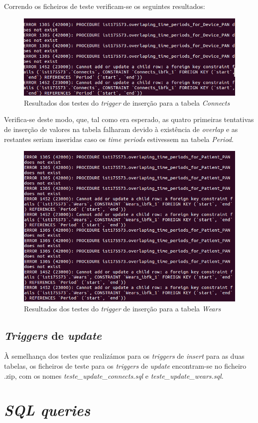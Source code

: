 \documentclass[a4paper]{article}
\begin{document}
Correndo os ficheiros de teste verificam-se os seguintes resultados:

\begin{figure}[ht!]
\centering
\includegraphics[scale=0.7]{insert_connects.png}
\caption{Resultados dos testes do \textit{trigger} de inserção para a tabela \textit{Connects}}
\end{figure}

Verifica-se deste modo, que, tal como era esperado, as quatro primeiras tentativas de inserção de valores na tabela falharam devido à existência de \textit{overlap} e as restantes seriam inseridas caso os \textit{time periods} estivessem na tabela \textit{Period}.

\begin{figure}[ht!]
\centering
\includegraphics[scale=0.7]{insert_wears.png}
\caption{Resultados dos testes do \textit{trigger} de inserção para a tabela \textit{Wears}}
\end{figure}

\subsection{\textit{Triggers} de \textit{update}}
À semelhança dos testes que realizámos para os \textit{triggers} de \textit{insert} para as duas tabelas, os ficheiros de teste para os \textit{triggers} de \textit{update} encontram-se no ficheiro .zip, com os nomes \textit{teste\_update\_connects.sql} e \textit{teste\_update\_wears.sql}.

\section{\textit{SQL queries}}
\end{document}
